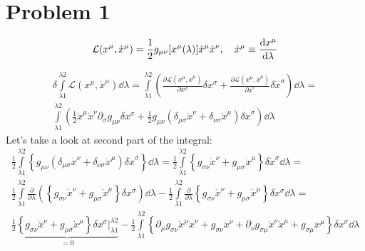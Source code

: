 
\section*{Problem 1}

\begin{equation}
    \mathcal{L}(x^\mu,\dot{x}^\mu) =
    \frac{1}{2}g_{\mu\nu}[x^\mu(\lambda)]\dot{x}^\mu\dot{x}^\nu, \quad
    \dot{x}^{\mu} \equiv \frac{\operatorname{d\!} x^\mu}{\dd\lambda}
\end{equation}

\begin{multline}
    \delta\int\limits_{\lambda1}^{\lambda2}\mathcal{L}(x^\mu,\dot{x}^\mu)\dd\lambda =
    \int\limits_{\lambda1}^{\lambda2}
    \left(\frac{\partial\mathcal{L}(x^\mu,\dot{x}^\mu)}{\partial x^\sigma}\delta x^\sigma +
    \frac{\partial\mathcal{L}(x^\mu,\dot{x}^\mu)}{\partial \dot{x}^\sigma}\delta \dot{x}^\sigma\right)\dd\lambda = \\
    \int\limits_{\lambda1}^{\lambda2}
    \left(\frac{1}{2}\dot{x}^\mu\dot{x}^\nu \partial_\sigma g_{\mu\nu} \delta x^\sigma +
    \frac{1}{2}g_{\mu\nu}(\delta_{\mu\sigma} \dot{x}^\nu + \delta_{\nu\sigma} \dot{x}^\mu)\delta \dot{x}^\sigma\right)\dd\lambda
\end{multline}
%
Let's take a look at second part of the integral:
%
\begin{multline}
    \frac{1}{2}\int\limits_{\lambda1}^{\lambda2}
    \left\{g_{\mu\nu}(\delta_{\mu\sigma}
    \dot{x}^\nu + \delta_{\nu\sigma} \dot{x}^\mu)\delta \dot{x}^\sigma\right\}\dd\lambda =
    \frac{1}{2}\int\limits_{\lambda1}^{\lambda2}
    \left\{g_{\sigma\nu}\dot{x}^\nu + g_{\mu\sigma}\dot{x}^\mu \right\}
    \delta\dot{x}^\sigma\dd\lambda = \\
    \frac{1}{2}\int\limits_{\lambda1}^{\lambda2}
    \frac{\partial}{\partial\lambda}\left(\left\{
    g_{\sigma\nu}\dot{x}^\nu + g_{\mu\sigma}\dot{x}^\mu
    \right\}\delta x^\sigma\right)\dd\lambda -
    \frac{1}{2}\int\limits_{\lambda1}^{\lambda2}
    \frac{\partial}{\partial\lambda}\left\{
    g_{\sigma\nu}\dot{x}^\nu + g_{\mu\sigma}\dot{x}^\mu
    \right\}\delta x^\sigma\dd\lambda= \\
    \frac{1}{2}\underbrace{\left\{g_{\sigma\nu}\dot{x}^\nu + g_{\mu\sigma}\dot{x}^\mu\right\} \delta x^\sigma \Bigg|_{\lambda1}^{\lambda2}}_{=0} -
    \frac{1}{2}\int\limits_{\lambda1}^{\lambda2}
    \left\{
    \partial_{\mu}g_{\sigma\nu}\dot{x}^\mu\dot{x}^\nu + g_{\sigma\nu}\ddot{x}^\nu +
    \partial_{\nu}g_{\sigma\mu}\dot{x}^\nu\dot{x}^\mu + g_{\sigma\mu}\ddot{x}^\mu
    \right\}\delta x^\sigma\dd\lambda \\
\end{multline}
